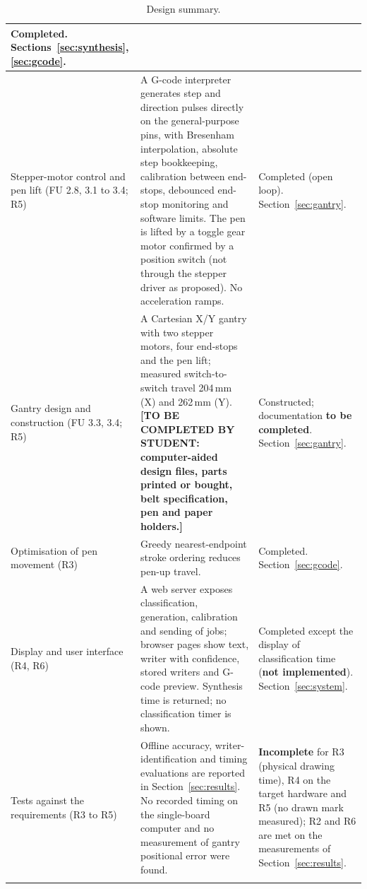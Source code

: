 {\begin{longtable}{|p{3.3cm}|p{7.0cm}|p{4.3cm}|}
Completed. Sections~\ref{sec:synthesis}, \ref{sec:gcode}. \\
\hline
Stepper-motor control and pen lift (FU 2.8, 3.1 to 3.4; R5) &
A G-code interpreter generates step and direction pulses directly on the general-purpose pins, with Bresenham interpolation, absolute step bookkeeping, calibration between end-stops, debounced end-stop monitoring and software limits. The pen is lifted by a toggle gear motor confirmed by a position switch (not through the stepper driver as proposed). No acceleration ramps. &
Completed (open loop). Section~\ref{sec:gantry}. \\
\hline
Gantry design and construction (FU 3.3, 3.4; R5) &
A Cartesian X/Y gantry with two stepper motors, four end-stops and the pen lift; measured switch-to-switch travel 204\,mm (X) and 262\,mm (Y). \textbf{[TO BE COMPLETED BY STUDENT: computer-aided design files, parts printed or bought, belt specification, pen and paper holders.]} &
Constructed; documentation \textbf{to be completed}. Section~\ref{sec:gantry}. \\
\hline
Optimisation of pen movement (R3) &
Greedy nearest-endpoint stroke ordering reduces pen-up travel. &
Completed. Section~\ref{sec:gcode}. \\
\hline
Display and user interface (R4, R6) &
A web server exposes classification, generation, calibration and sending of jobs; browser pages show text, writer with confidence, stored writers and G-code preview. Synthesis time is returned; no classification timer is shown. &
Completed except the display of classification time (\textbf{not implemented}). Section~\ref{sec:system}. \\
\hline
Tests against the requirements (R3 to R5) &
Offline accuracy, writer-identification and timing evaluations are reported in Section~\ref{sec:results}. No recorded timing on the single-board computer and no measurement of gantry positional error were found. &
\textbf{Incomplete} for R3 (physical drawing time), R4 on the target hardware and R5 (no drawn mark measured); R2 and R6 are met on the measurements of Section~\ref{sec:results}. \\
\caption{Design summary.}
\label{tab:des-summary}
\end{longtable}
}
